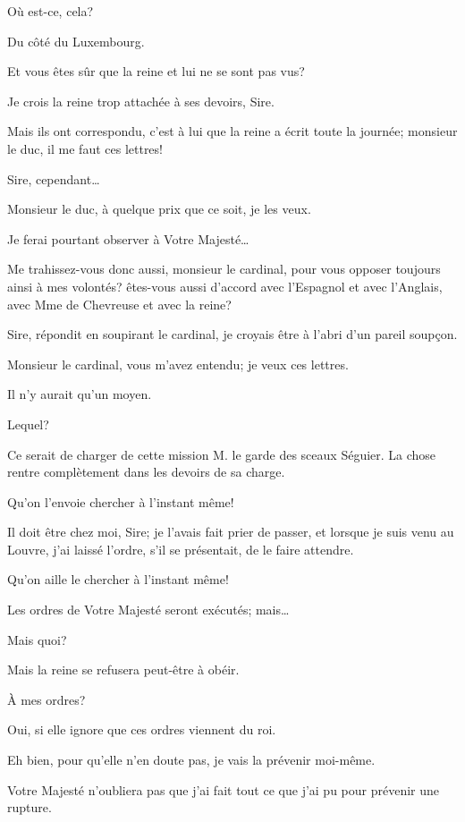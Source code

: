 \speak  Où est-ce, cela? 

\speak  Du côté du Luxembourg. 

\speak  Et vous êtes sûr que la reine et lui ne se sont pas vus? 

\speak  Je crois la reine trop attachée à ses devoirs, Sire. 

\speak  Mais ils ont correspondu, c'est à lui que la reine a écrit toute la journée; monsieur le duc, il me faut ces lettres! 

\speak  Sire, cependant\dots 

\speak  Monsieur le duc, à quelque prix que ce soit, je les veux. 

\speak  Je ferai pourtant observer à Votre Majesté\dots 

\speak  Me trahissez-vous donc aussi, monsieur le cardinal, pour vous opposer toujours ainsi à mes volontés? êtes-vous aussi d'accord avec l'Espagnol et avec l'Anglais, avec Mme de Chevreuse et avec la reine? 

\speak  Sire, répondit en soupirant le cardinal, je croyais être à l'abri d'un pareil soupçon. 

\speak  Monsieur le cardinal, vous m'avez entendu; je veux ces lettres. 

\speak  Il n'y aurait qu'un moyen. 

\speak  Lequel? 

\speak  Ce serait de charger de cette mission M. le garde des sceaux Séguier. La chose rentre complètement dans les devoirs de sa charge. 

\speak  Qu'on l'envoie chercher à l'instant même! 

\speak  Il doit être chez moi, Sire; je l'avais fait prier de passer, et lorsque je suis venu au Louvre, j'ai laissé l'ordre, s'il se présentait, de le faire attendre. 

\speak  Qu'on aille le chercher à l'instant même! 

\speak  Les ordres de Votre Majesté seront exécutés; mais\dots 

\speak  Mais quoi? 

\speak  Mais la reine se refusera peut-être à obéir. 

\speak  À mes ordres? 

\speak  Oui, si elle ignore que ces ordres viennent du roi. 

\speak  Eh bien, pour qu'elle n'en doute pas, je vais la prévenir moi-même. 

\speak  Votre Majesté n'oubliera pas que j'ai fait tout ce que j'ai pu pour prévenir une rupture. 

